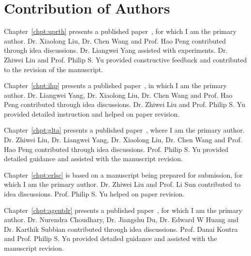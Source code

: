 \chapter*{Contribution of Authors}

Chapter~\ref{chpt:uprth} presents a published paper~\cite{uprth}, for which I am the primary author. Dr. Xiaolong Liu, Dr. Chen Wang and Prof. Hao Peng contributed through idea discussions. Dr. Liangwei Yang assisted with experiments. Dr. Zhiwei Liu and Prof. Philip S. Yu provided constructive feedback and contributed to the revision of the manuscript.

Chapter~\ref{chpt:ihp} presents a published paper~\cite{ihp}, in which I am the primary author. Dr. Liangwei Yang, Dr. Xiaolong Liu, Dr. Chen Wang and Prof. Hao Peng contributed through idea discussions. Dr. Zhiwei Liu and Prof. Philip S. Yu provided detailed instruction and helped on paper revision.

Chapter~\ref{chpt:glta} presents a published paper~\cite{glta}, where I am the primary author. Dr. Zhiwei Liu, Dr. Liangwei Yang, Dr. Xiaolong Liu, Dr. Chen Wang and Prof. Hao Peng contributed through idea discussions. Prof. Philip S. Yu provided detailed guidance and assisted with the manuscript revision.

Chapter~\ref{chpt:erlsc} is based on a manuscript being prepared for submission, for which I am the primary author. Dr. Zhiwei Liu and Prof. Li Sun contributed to idea discussions. Prof. Philip S. Yu helped on paper revision.

Chapter~\ref{chpt:agentdr} presents a published paper~\cite{agentdr}, for which I am the primary author. Dr. Nurendra Choudhary, Dr. Jiangshu Du, Dr. Edward W Huang and Dr. Karthik Subbian contributed through idea discussions. Prof. Danai Koutra and Prof. Philip S. Yu provided detailed guidance and assisted with the manuscript revision.
